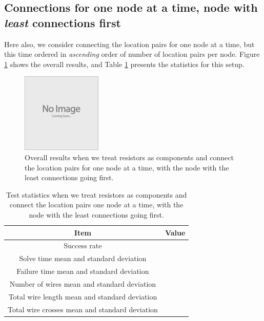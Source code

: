 \subsection{Connections for one node at a time, node with \textit{least}
connections first}

Here also, we consider connecting the location pairs for one node at a time,
but this time ordered in \textit{ascending} order of number of location pairs
per node. Figure \ref{fig:as_comp_node_a} shows the overall results, and Table
\ref{tb:as_comp_node_a} presents the statistics for this setup.

\begin{figure}[H]
\begin{center}
\includegraphics{Images/placeholder.jpg}
\caption{Overall results when we treat resistors as components and connect the
location pairs for one node at a time, with the node with the least connections
going first.}
\label{fig:as_comp_node_a}
\end{center}
\end{figure}

\begin{table}[H]
\begin{center}
\begin{singlespace}
\begin{tabular}{| c | c |}
\hline
Item & Value \\
\hline\hline
Success rate & \\
Solve time mean and standard deviation & \\
Failure time mean and standard deviation & \\
Number of wires mean and standard deviation & \\
Total wire length mean and standard deviation & \\
Total wire crosses mean and standard deviation & \\
\hline
\end{tabular}
\end{singlespace}
\end{center}
\label{tb:as_comp_node_a}
\caption{Test statistics when we treat resistors as components and connect the
location pairs one node at a time, with the node with the least connections
going first.}
\end{table}

